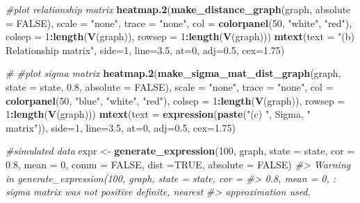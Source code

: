 \documentclass[]{article}
\newenvironment{Shaded}{\begin{snugshade}}{\end{snugshade}}
\newcommand{\CommentTok}[1]{\textcolor[rgb]{0.56,0.35,0.01}{\textit{#1}}}
\newcommand{\DataTypeTok}[1]{\textcolor[rgb]{0.13,0.29,0.53}{#1}}
\newcommand{\DecValTok}[1]{\textcolor[rgb]{0.00,0.00,0.81}{#1}}
\newcommand{\FloatTok}[1]{\textcolor[rgb]{0.00,0.00,0.81}{#1}}
\newcommand{\KeywordTok}[1]{\textcolor[rgb]{0.13,0.29,0.53}{\textbf{#1}}}
\newcommand{\NormalTok}[1]{#1}
\newcommand{\OperatorTok}[1]{\textcolor[rgb]{0.81,0.36,0.00}{\textbf{#1}}}
\newcommand{\OtherTok}[1]{\textcolor[rgb]{0.56,0.35,0.01}{#1}}
\newcommand{\StringTok}[1]{\textcolor[rgb]{0.31,0.60,0.02}{#1}}
\begin{document}
\begin{Shaded}
\begin{Highlighting}[]
\CommentTok{#plot relationship matrix}
\KeywordTok{heatmap.2}\NormalTok{(}\KeywordTok{make_distance_graph}\NormalTok{(graph, }\DataTypeTok{absolute =} \OtherTok{FALSE}\NormalTok{),}
          \DataTypeTok{scale =} \StringTok{"none"}\NormalTok{, }\DataTypeTok{trace =} \StringTok{"none"}\NormalTok{, }\DataTypeTok{col =} \KeywordTok{colorpanel}\NormalTok{(}\DecValTok{50}\NormalTok{, }\StringTok{"white"}\NormalTok{, }\StringTok{"red"}\NormalTok{),}
\DataTypeTok{colsep =} \DecValTok{1}\OperatorTok{:}\KeywordTok{length}\NormalTok{(}\KeywordTok{V}\NormalTok{(graph)), }\DataTypeTok{rowsep =} \DecValTok{1}\OperatorTok{:}\KeywordTok{length}\NormalTok{(}\KeywordTok{V}\NormalTok{(graph)))}
\KeywordTok{mtext}\NormalTok{(}\DataTypeTok{text =} \StringTok{"(b) Relationship matrix"}\NormalTok{, }\DataTypeTok{side=}\DecValTok{1}\NormalTok{, }\DataTypeTok{line=}\FloatTok{3.5}\NormalTok{, }\DataTypeTok{at=}\DecValTok{0}\NormalTok{, }\DataTypeTok{adj=}\FloatTok{0.5}\NormalTok{, }\DataTypeTok{cex=}\FloatTok{1.75}\NormalTok{)}

\CommentTok{# #plot sigma matrix}
\KeywordTok{heatmap.2}\NormalTok{(}\KeywordTok{make_sigma_mat_dist_graph}\NormalTok{(graph, }\DataTypeTok{state =}\NormalTok{ state, }\FloatTok{0.8}\NormalTok{, }\DataTypeTok{absolute =} \OtherTok{FALSE}\NormalTok{),}
\DataTypeTok{scale =} \StringTok{"none"}\NormalTok{, }\DataTypeTok{trace =} \StringTok{"none"}\NormalTok{, }\DataTypeTok{col =} \KeywordTok{colorpanel}\NormalTok{(}\DecValTok{50}\NormalTok{, }\StringTok{"blue"}\NormalTok{, }\StringTok{"white"}\NormalTok{, }\StringTok{"red"}\NormalTok{),}
\DataTypeTok{colsep =} \DecValTok{1}\OperatorTok{:}\KeywordTok{length}\NormalTok{(}\KeywordTok{V}\NormalTok{(graph)), }\DataTypeTok{rowsep =} \DecValTok{1}\OperatorTok{:}\KeywordTok{length}\NormalTok{(}\KeywordTok{V}\NormalTok{(graph)))}
\KeywordTok{mtext}\NormalTok{(}\DataTypeTok{text =} \KeywordTok{expression}\NormalTok{(}\KeywordTok{paste}\NormalTok{(}\StringTok{"(c) "}\NormalTok{, Sigma, }\StringTok{" matrix"}\NormalTok{)), }\DataTypeTok{side=}\DecValTok{1}\NormalTok{, }\DataTypeTok{line=}\FloatTok{3.5}\NormalTok{, }\DataTypeTok{at=}\DecValTok{0}\NormalTok{, }\DataTypeTok{adj=}\FloatTok{0.5}\NormalTok{, }\DataTypeTok{cex=}\FloatTok{1.75}\NormalTok{)}

\CommentTok{#simulated data}
\NormalTok{expr <-}\StringTok{ }\KeywordTok{generate_expression}\NormalTok{(}\DecValTok{100}\NormalTok{, graph,  }\DataTypeTok{state =}\NormalTok{ state, }\DataTypeTok{cor =} \FloatTok{0.8}\NormalTok{, }\DataTypeTok{mean =} \DecValTok{0}\NormalTok{,}
\DataTypeTok{comm =} \OtherTok{FALSE}\NormalTok{, }\DataTypeTok{dist =}\OtherTok{TRUE}\NormalTok{, }\DataTypeTok{absolute =} \OtherTok{FALSE}\NormalTok{)}
\CommentTok{#> Warning in generate_expression(100, graph, state = state, cor =}
\CommentTok{#> 0.8, mean = 0, : sigma matrix was not positive definite, nearest}
\CommentTok{#> approximation used.}


\end{Highlighting}
\end{Shaded}
\end{document}
